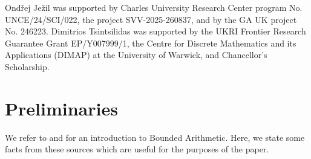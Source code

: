 \documentclass[11pt]{article}
\theoremstyle{definition}
\theoremstyle{definition}
\theoremstyle{remark}
\begin{document}
Ondřej Ježil was supported by Charles University Research Center program No. UNCE/24/SCI/022, the project SVV-2025-260837, and by the GA UK project No. 246223. Dimitrios Tsintsilidas was supported by the UKRI Frontier Research Guarantee Grant EP/Y007999/1, the Centre for Discrete Mathematics and its Applications (DIMAP) at the University of Warwick, and Chancellor’s Scholarship.

\section{Preliminaries}\label{sec:preliminaries}

We refer to \cite{buss1985bounded} and \cite{krajicek1995bounded} for an introduction to Bounded Arithmetic. Here, we state some facts from these sources which are useful for the purposes of the paper.
\end{document}
